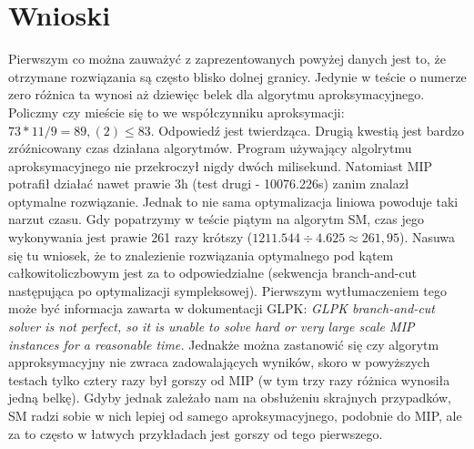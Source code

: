\section{Wnioski}
Pierwszym co można zauważyć z zaprezentowanych powyżej danych jest to, że otrzymane rozwiązania są często blisko dolnej granicy. Jedynie w teście o numerze zero różnica ta wynosi aż dziewięc belek dla algorytmu aproksymacyjnego. Policzmy czy mieście się to we współczynniku aproksymacji: $73*11/9=89,(2) \leq 83$. Odpowiedź jest twierdząca. 
Drugią kwestią jest bardzo zróźnicowany czas działana algorytmów.
Program używający algolrytmu aproksymacyjnego nie przekroczył nigdy dwóch milisekund. Natomiast MIP potrafił działać nawet prawie 3h (test drugi - 10076.226s) zanim znalazł optymalne rozwiązanie. Jednak to nie sama optymalizacja liniowa powoduje taki narzut czasu. Gdy popatrzymy w teście piątym na algorytm SM, czas jego wykonywania jest prawie 261 razy krótszy ($1211.544÷4.625 \approx 261,95$). Nasuwa się tu wniosek, że to znalezienie rozwiązania optymalnego pod kątem całkowitoliczbowym jest za to odpowiedzialne (sekwencja branch-and-cut następująca po optymalizacji sympleksowej). 
Pierwszym wytłumaczeniem tego może być informacja zawarta w dokumentacji GLPK: \textit{GLPK branch-and-cut solver is not perfect, so it is unable to solve hard or very large scale MIP instances for a reasonable time.} 
Jednakże można zastanowić się czy algorytm approksymacyjny nie zwraca zadowalających wyników, skoro w powyższych testach tylko cztery razy był gorszy od MIP (w tym trzy razy różnica wynosiła jedną belkę). Gdyby jednak zależało nam na obsłużeniu skrajnych przypadków, SM radzi sobie w nich lepiej od samego aproksymacyjnego, podobnie do MIP, ale za to często w łatwych przykładach jest gorszy od tego pierwszego.



